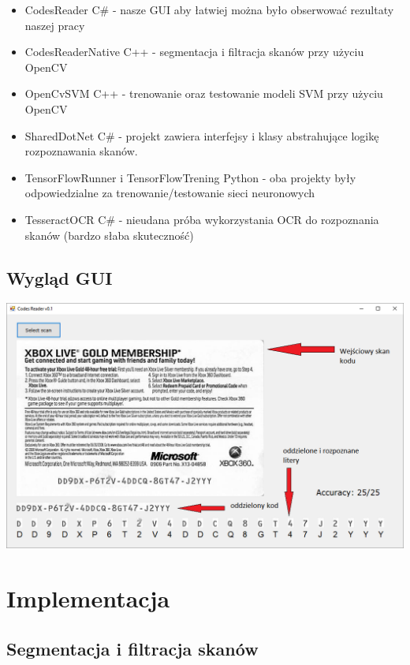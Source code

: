 \documentclass[titlepage,10pt,a4paper]{article}
\begin{document}
\begin{itemize}
	\item CodesReader C\# - nasze GUI aby łatwiej można było obserwować rezultaty naszej pracy
	\item CodesReaderNative C++ - segmentacja i filtracja skanów przy użyciu OpenCV
	\item OpenCvSVM C++ - trenowanie oraz testowanie modeli SVM przy użyciu OpenCV
	\item SharedDotNet C\# - projekt zawiera interfejsy i klasy abstrahujące logikę rozpoznawania skanów.
	\item TensorFlowRunner i TensorFlowTrening Python - oba projekty były odpowiedzialne za trenowanie/testowanie sieci neuronowych
	\item TesseractOCR C\# - nieudana próba wykorzystania OCR do rozpoznania skanów (bardzo słaba skuteczność)
\end{itemize}

\subsection{Wygląd GUI}
{\centering
	\vspace{1cm}
	\hspace*{-3.4cm}
	\includegraphics[scale=0.67]{foto1.png}
}


\section{Implementacja}
\subsection{Segmentacja i filtracja skanów}
\end{document}
